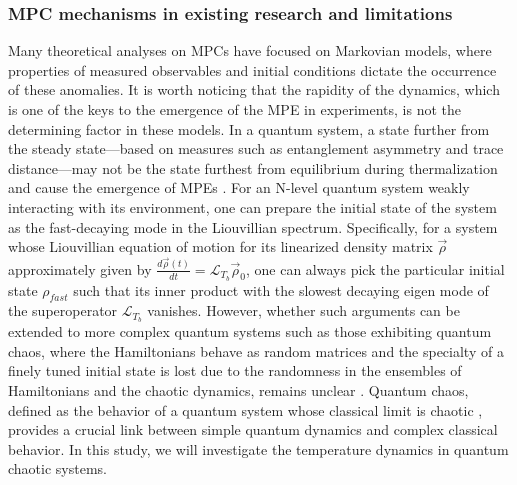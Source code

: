 \documentclass[prl,superscriptaddress,notitlepage,showpacs,twocolumn]{revtex4-2}
\begin{document}
\subsubsection{MPC mechanisms in existing research and limitations} %
Many theoretical analyses on MPCs have focused on Markovian models, where properties of measured observables and initial conditions dictate the occurrence of these anomalies. It is worth noticing that the rapidity of the dynamics, which is one of the keys to the emergence of the MPE in experiments, is not the determining factor in these models. In a quantum system, a state further from the steady state—based on measures such as entanglement asymmetry and trace distance—may not be the state furthest from equilibrium during thermalization and cause the emergence of MPEs \cite{ares2023entanglement,murciano2024entanglement,yamashika2024entanglement,liu2024symmetry,chalas2024multiple}. For an N-level quantum system weakly interacting with its environment, one can prepare the initial state of the system as the fast-decaying mode in the Liouvillian spectrum. Specifically, for a system whose Liouvillian equation of motion for its linearized density matrix $\Vec{\rho}$ approximately given by $\frac{d \vec\rho(t)}{dt}=\mathscr{L}_{T_b} \vec\rho_0$, one can always pick the particular initial state $\rho_{fast}$ such that its inner product with the slowest decaying eigen mode of the superoperator $\mathscr{L}_{T_b}$ vanishes. %
However, whether such arguments can be extended to more complex quantum systems such as those exhibiting quantum chaos, where the Hamiltonians behave as random matrices and the specialty of a finely tuned initial state is lost due to the randomness in the ensembles of Hamiltonians and the chaotic dynamics, remains unclear \cite{maldacena2016bound,touil2021information}. %
Quantum chaos, defined as the behavior of a quantum system whose classical limit is chaotic \cite{maldacena2016bound,scaffidi2019chaos,casati2022quantum}, provides a crucial link between simple quantum dynamics and complex classical behavior. In this study, we will investigate the temperature dynamics in quantum chaotic systems.
\end{document}
